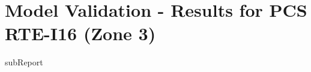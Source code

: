 




    \section{Model Validation - Results for PCS RTE-I16 (Zone 3)}

    {{subReport}}
    \newpage

